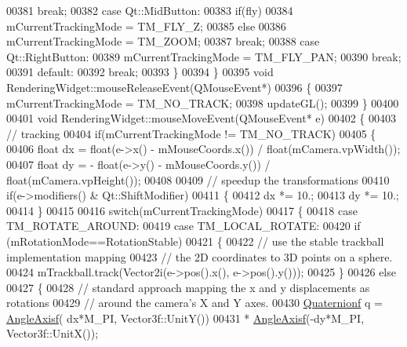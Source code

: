 \begin{DoxyCode}
00381       \textcolor{keywordflow}{break};
00382     \textcolor{keywordflow}{case} Qt::MidButton:
00383       \textcolor{keywordflow}{if}(fly)
00384         mCurrentTrackingMode = TM\_FLY\_Z;
00385       \textcolor{keywordflow}{else}
00386         mCurrentTrackingMode = TM\_ZOOM;
00387       \textcolor{keywordflow}{break};
00388     \textcolor{keywordflow}{case} Qt::RightButton:
00389         mCurrentTrackingMode = TM\_FLY\_PAN;
00390       \textcolor{keywordflow}{break};
00391     \textcolor{keywordflow}{default}:
00392       \textcolor{keywordflow}{break};
00393   \}
00394 \}
00395 \textcolor{keywordtype}{void} RenderingWidget::mouseReleaseEvent(QMouseEvent*)
00396 \{
00397     mCurrentTrackingMode = TM\_NO\_TRACK;
00398     updateGL();
00399 \}
00400 
00401 \textcolor{keywordtype}{void} RenderingWidget::mouseMoveEvent(QMouseEvent* e)
00402 \{
00403     \textcolor{comment}{// tracking}
00404     \textcolor{keywordflow}{if}(mCurrentTrackingMode != TM\_NO\_TRACK)
00405     \{
00406         \textcolor{keywordtype}{float} dx =   float(e->x() - mMouseCoords.x()) / \textcolor{keywordtype}{float}(mCamera.vpWidth());
00407         \textcolor{keywordtype}{float} dy = - float(e->y() - mMouseCoords.y()) / \textcolor{keywordtype}{float}(mCamera.vpHeight());
00408 
00409         \textcolor{comment}{// speedup the transformations}
00410         \textcolor{keywordflow}{if}(e->modifiers() & Qt::ShiftModifier)
00411         \{
00412           dx *= 10.;
00413           dy *= 10.;
00414         \}
00415 
00416         \textcolor{keywordflow}{switch}(mCurrentTrackingMode)
00417         \{
00418           \textcolor{keywordflow}{case} TM\_ROTATE\_AROUND:
00419           \textcolor{keywordflow}{case} TM\_LOCAL\_ROTATE:
00420             \textcolor{keywordflow}{if} (mRotationMode==RotationStable)
00421             \{
00422               \textcolor{comment}{// use the stable trackball implementation mapping}
00423               \textcolor{comment}{// the 2D coordinates to 3D points on a sphere.}
00424               mTrackball.track(Vector2i(e->pos().x(), e->pos().y()));
00425             \}
00426             \textcolor{keywordflow}{else}
00427             \{
00428               \textcolor{comment}{// standard approach mapping the x and y displacements as rotations}
00429               \textcolor{comment}{// around the camera's X and Y axes.}
00430               \hyperlink{group___geometry___module_class_eigen_1_1_quaternion}{Quaternionf} q = \hyperlink{group___geometry___module_gadc7128416da41ca99bb8af814b78599e}{AngleAxisf}( dx*M\_PI, Vector3f::UnitY())
00431                             * \hyperlink{group___geometry___module_gadc7128416da41ca99bb8af814b78599e}{AngleAxisf}(-dy*M\_PI, Vector3f::UnitX());

\end{DoxyCode}
